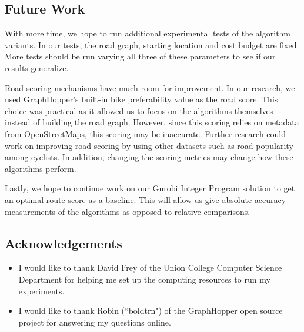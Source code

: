 \documentclass[honors]{union-cs-thesis}
\begin{document}
\subsection{Future Work}
With more time, we hope to run additional experimental tests of the algorithm variants. In our tests, the road graph, starting location and cost budget are fixed. More tests should be run varying all three of these parameters to see if our results generalize.  

Road scoring mechanisms have much room for improvement. In our research, we used GraphHopper's built-in bike preferability value as the road score. This choice was practical as it allowed us to focus on the algorithms themselves instead of building the road graph. However, since this scoring relies on metadata from OpenStreetMaps, this scoring may be inaccurate. Further research could work on improving road scoring by using other datasets such as road popularity among cyclists. In addition, changing the scoring metrics may change how these algorithms perform.

Lastly, we hope to continue work on our Gurobi Integer Program solution to get an optimal route score as a baseline. This will allow us give absolute accuracy measurements of the algorithms as opposed to relative comparisons.

\subsection{Acknowledgements}
\begin{itemize}
    \item I would like to thank David Frey of the Union College Computer Science Department for helping me set up the computing resources to run my experiments.
    \item I would like to thank Robin (``boldtrn") of the GraphHopper open source project for answering my questions online.   
\end{itemize}


\appendix
\end{document}
